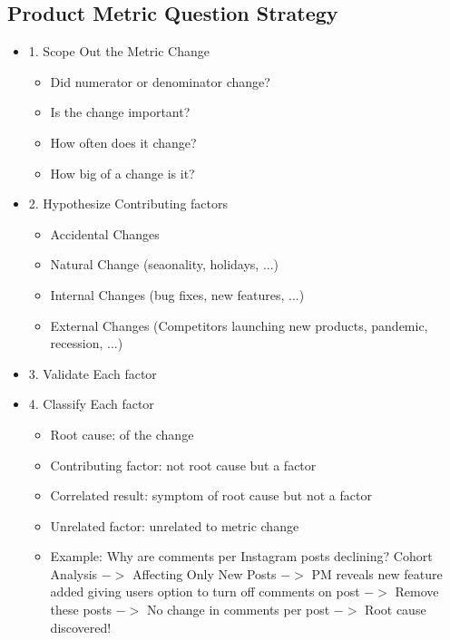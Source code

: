 \documentclass{article}
\begin{document}
\begin{multicols*}{2}
    \section{Product Metric Question Strategy}
    \renewcommand\labelitemi{{\boldmath$\cdot$}}
    \begin{itemize}[noitemsep]
        \item 1. Scope Out the Metric Change
        \begin{itemize}
            \item Did numerator or denominator change?
            \item Is the change important?
            \item How often does it change?
            \item How big of a change is it?
        \end{itemize}
        \item 2. Hypothesize Contributing factors
        \begin{itemize}
            \item Accidental Changes
            \item Natural Change (seaonality, holidays, ...)
            \item Internal Changes (bug fixes, new features, ...)
            \item External Changes (Competitors launching new products, 
            pandemic, recession, ...)
        \end{itemize}
        \item 3. Validate Each factor
        \item 4. Classify Each factor
        \begin{itemize}
            \item Root cause: of the change 
            \item Contributing factor: not root cause but a factor
            \item Correlated result: symptom of root cause but not a factor 
            \item Unrelated factor: unrelated to metric change 
            \item Example: Why are comments per Instagram posts declining?
            Cohort Analysis $->$ Affecting Only New Posts $->$ PM reveals 
            new feature added giving users option to turn off comments 
            on post $->$ Remove these posts $->$ No change in comments per post $->$
            Root cause discovered!
        \end{itemize}
    \end{itemize}


\end{multicols*}
\end{document}
